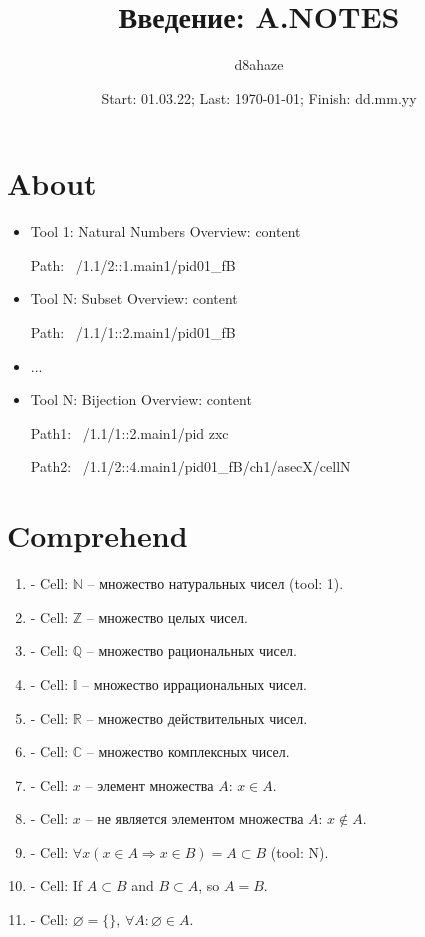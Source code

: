 \documentclass{spaceA}
\author{d8ahaze}
\date{Start: 01.03.22; Last: \today; Finish: dd.mm.yy}
\title{Введение: A.NOTES} %
\begin{document}
 \maketitle

\asec

\section{About}

\begin{itemize}
  \item Tool 1: Natural Numbers
    Overview: content

    Path: ~/1.1/2::1.main1/pid01\_fB
  \item Tool N: Subset
    Overview: content

    Path: ~/1.1/1::2.main1/pid01\_fB
  \item ...
  \item Tool N: Bijection
    Overview: content

    Path1: ~/1.1/1::2.main1/pid zxc

    Path2: ~/1.1/2::4.main1/pid01\_fB/ch1/asecX/cellN
\end{itemize}

\section{Comprehend}

\begin{enumerate}
  \item - Cell: $\mathbb{N}$ -- множество натуральных чисел (tool: 1).
  \item - Cell: $\mathbb{Z}$ -- множество целых чисел.
  \item - Cell: $\mathbb{Q}$ -- множество рациональных чисел.
  \item - Cell: $\mathbb{I}$ -- множество иррациональных чисел.
  \item - Cell: $\mathbb{R}$ -- множество действительных чисел.
  \item - Cell: $\mathbb{C}$ -- множество комплексных чисел.
  \item - Cell: $x$ -- элемент множества $A$: $x \in A$.
  \item - Cell: $x$ -- не является элементом множества $A$: $x \notin A$.
  \item - Cell: $\forall x \left ( x \in A \Rightarrow x \in B \right ) = A \subset B$ (tool: N).
  \item - Cell: If $A \subset B$ and $B \subset A$, so $A = B$.
  \item - Cell: $\varnothing = \{ \}$, $\forall A: \varnothing \in A$.
\end{enumerate}
\end{document}
